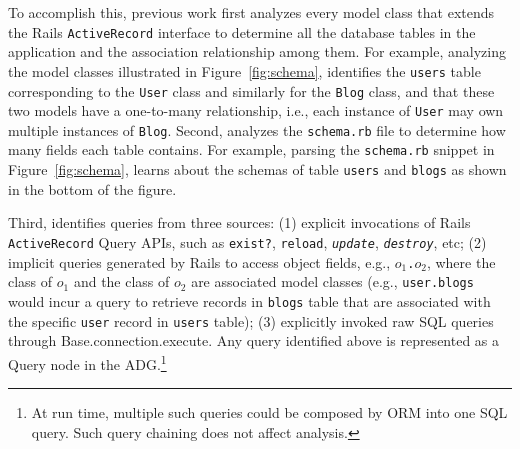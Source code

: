 To accomplish this, previous work first analyzes every model class that extends the Rails
{\tt ActiveRecord} interface to determine all the database
tables in the application and the association relationship among them.
For example, analyzing the model classes illustrated in 
Figure~\ref{fig:schema}, \ToolP identifies the {\tt users} table
corresponding to the {\tt User} class and similarly for the {\tt Blog} class, and that these two models have 
a one-to-many relationship, i.e., each instance of {\tt User} may own multiple instances of {\tt Blog}.
Second, \ToolP analyzes the {\tt schema.rb} file to determine
how many fields each table contains. For example, parsing the
{\tt schema.rb} snippet in Figure~\ref{fig:schema}, \ToolP learns about 
the schemas of table {\tt users} and {\tt blogs} as
shown in the bottom of the figure.

Third, \ToolP identifies queries from three sources: (1) explicit 
invocations of
Rails {\tt ActiveRecord} Query APIs, such as {\tt exist?},
{\tt reload}, \textit{\tt update}, \textit{\tt destroy}, etc;
(2) implicit queries generated by Rails to access object fields, e.g., {\tt $o_1$.$o_2$}, where 
the class of $o_1$ and the class of $o_2$ are associated model classes
(e.g., {\tt user.blogs} would incur a query to
retrieve records in {\tt blogs} table that are associated with
the specific {\tt user} record in {\tt users} table);
(3) explicitly invoked raw SQL queries through  Base.connection.execute.
Any query identified above is represented as a Query node in the ADG.\footnote{At run time,
multiple such queries could be composed by ORM into one SQL query.
Such query chaining does not affect \ToolP analysis.}
\fi